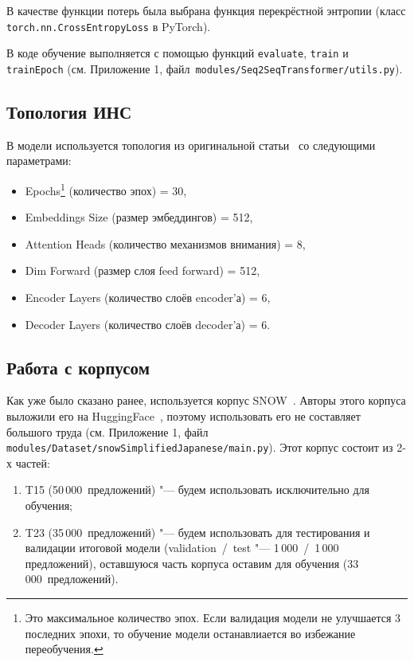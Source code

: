 В качестве функции потерь была выбрана функция перекрёстной энтропии (класс \texttt{torch.nn.CrossEntropyLoss} в PyTorch).

В коде обучение выполняется с помощью функций \texttt{evaluate}, \texttt{train} и \texttt{trainEpoch} (см. Приложение 1, файл~\texttt{modules/Seq2SeqTransformer/utils.py}).


\subsection{Топология ИНС}


В модели используется топология из оригинальной статьи~\cite{vaswani2017attention} со следующими параметрами:
\begin{itemize}%
  \item Epochs\footnote{Это максимальное количество эпох. Если валидация модели не улучшается 3 последних эпохи, то обучение модели останавлиается во избежание переобучения.} (количество эпох) = 30,
  \item Embeddings Size (размер эмбеддингов) = 512,
  \item Attention Heads (количество механизмов внимания) = 8,
  \item Dim Forward (размер слоя feed forward) = 512,
  \item Encoder Layers (количество слоёв encoder'а) = 6,
  \item Decoder Layers (количество слоёв decoder'а) = 6.
\end{itemize}


\subsection{Работа с корпусом}


Как уже было сказано ранее, используется корпус SNOW~\cite{snow-dataset}.
Авторы этого корпуса выложили его на HuggingFace~\cite{HuggingFace}, поэтому использовать его не составляет большого труда (см. Приложение 1, файл \texttt{modules/Dataset/snowSimplifiedJapanese/main.py}).
Этот корпус состоит из 2-х частей:
\begin{enumerate}[1.]%
  \item T15 (50\,000~предложений) "--- будем использовать исключительно для обучения;
  \item T23 (35\,000~предложений) "--- будем использовать для тестирования и валидации итоговой модели (validation~/~test "--- 1\,000~/~1\,000 предложений), оставшуюся часть корпуса оставим для обучения (33\,000~предложений).
\end{enumerate}



